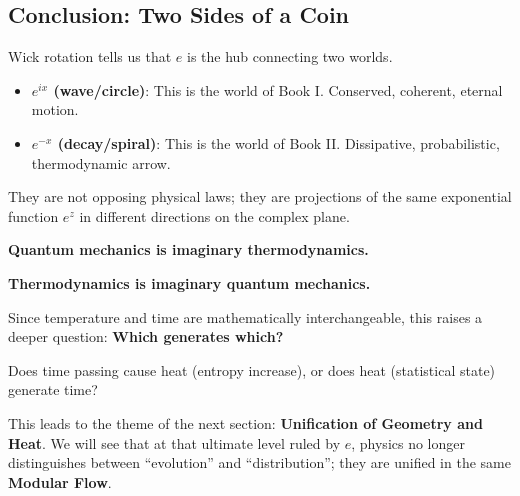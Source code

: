 \subsection{Conclusion: Two Sides of a Coin}

Wick rotation tells us that $e$ is the hub connecting two worlds.

\begin{itemize}
\item \textbf{$e^{ix}$ (wave/circle)}: This is the world of Book I. Conserved, coherent, eternal motion.

\item \textbf{$e^{-x}$ (decay/spiral)}: This is the world of Book II. Dissipative, probabilistic, thermodynamic arrow.
\end{itemize}

They are not opposing physical laws; they are projections of the same exponential function $e^z$ in different directions on the complex plane.

\textbf{Quantum mechanics is imaginary thermodynamics.}

\textbf{Thermodynamics is imaginary quantum mechanics.}

Since temperature and time are mathematically interchangeable, this raises a deeper question: \textbf{Which generates which?}

Does time passing cause heat (entropy increase), or does heat (statistical state) generate time?

This leads to the theme of the next section: \textbf{Unification of Geometry and Heat}. We will see that at that ultimate level ruled by $e$, physics no longer distinguishes between ``evolution'' and ``distribution''; they are unified in the same \textbf{Modular Flow}.

